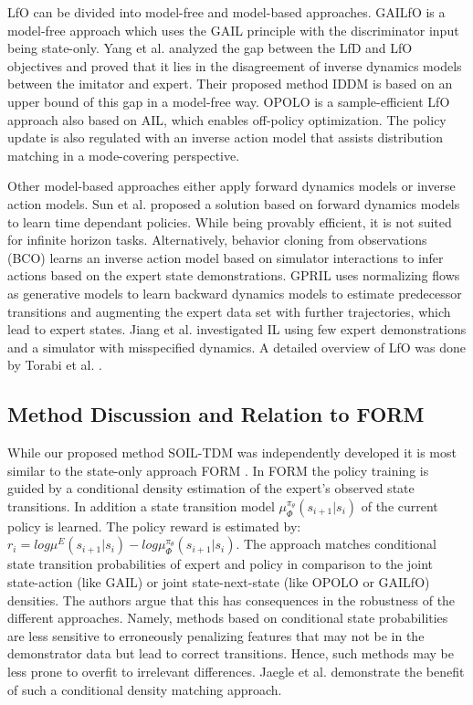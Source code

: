 \documentclass{article}
\begin{document}
LfO can be divided into model-free and model-based approaches. GAILfO \cite{torabi2018generative} is a model-free approach which uses the GAIL principle with the discriminator input being state-only. Yang et al.  analyzed the gap between the LfD and LfO objectives and proved that it lies in the disagreement of inverse dynamics models between the imitator and expert. Their proposed method IDDM is based on an upper bound of this gap in a model-free way. OPOLO \cite{zhu2020off} is a sample-efficient LfO approach also based on AIL, which enables off-policy optimization. The policy update is also regulated with an inverse action model that assists distribution matching in a mode-covering perspective. 

Other model-based approaches either apply forward dynamics models or inverse action models. Sun et al.  proposed a solution based on forward dynamics models to learn time dependant policies. While being provably efficient, it is not suited for infinite horizon tasks. Alternatively, behavior cloning from observations (BCO) \cite{torabi2018behavioral} learns an inverse action model based on simulator interactions to infer actions based on the expert state demonstrations. GPRIL \cite{schroecker2019generative} uses normalizing flows as generative models to learn backward dynamics models to estimate predecessor transitions and augmenting the expert data set with further trajectories, which lead to expert states.  Jiang et al.  investigated IL using few expert demonstrations and a simulator with misspecified dynamics. A detailed overview of LfO was done by Torabi et al. .  


\subsection{Method Discussion and Relation to FORM}
While our proposed method SOIL-TDM was independently developed it is most similar to the state-only approach FORM \cite{jaegle2021imitation}. In FORM the policy training is guided by a conditional density estimation of the expert’s observed state transitions. In addition a state transition model $\mu^{\pi_{\theta}}_{\Phi}(s_{i+1}|s_{i})$ of the current policy is learned. The policy reward is estimated by: $ r_i = log \mu^E(s_{i+1}|s_{i}) - log \mu^{\pi_{\theta}}_{\Phi}(s_{i+1}|s_{i})$. The approach matches conditional state transition probabilities of expert and policy in comparison to the joint state-action (like GAIL) or joint state-next-state (like OPOLO or GAILfO) densities. The authors argue that this has consequences in the robustness of the different approaches. Namely, methods  based on conditional state probabilities are less sensitive to erroneously penalizing features that may not be in the demonstrator data but lead to correct transitions. Hence, such methods may be less prone to overfit to irrelevant differences. Jaegle et al.  demonstrate the benefit of such a conditional density matching approach. 
\end{document}
